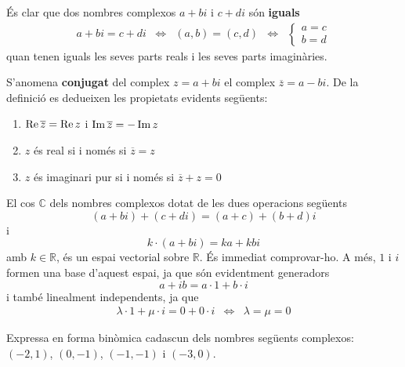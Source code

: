 És clar que dos nombres complexos $a+bi$ i $c+di$ són \textbf{iguals}
\begin{equation*}
\begin{array}{lllll}
a+bi=c+di & \Longleftrightarrow & (a,b)=(c,d) & \Longleftrightarrow &
\left\{
\begin{array}{l}
a=c \\
b=d
\end{array}
\right.
\end{array}
\end{equation*}
quan tenen iguals les seves parts reals i les seves parts imaginàries.

S’anomena \textbf{conjugat} del complex $z=a+bi$ el complex $\overline{z}
=a-bi$. De la definició es dedueixen les propietats evidents següents:

\begin{enumerate}
\item[1)] $\operatorname{Re}\overline{z}=\operatorname{Re}z$ i $\operatorname{Im}\overline{z}=-\operatorname{
Im}z$

\item[2)] $z$ és real si i només si $\overline{z}=z$

\item[3)] $z$ és imaginari pur si i només si $\overline{z}+z=0$
\end{enumerate}

El cos $\mathbb{C}$ dels nombres complexos dotat de les dues
operacions següents
\begin{equation*}
(a+bi)+(c+di)=(a+c)+(b+d)i
\end{equation*}
i
\begin{equation*}
k\cdot (a+bi)=ka+kbi
\end{equation*}
amb $k\in \mathbb{R}$, és un espai vectorial sobre $\mathbb{R}$. És immediat comprovar-ho. A més, $1$ i $i$ formen una base d’aquest espai, ja que són evidentment generadors
\begin{equation*}
a+ib=a\cdot 1+b\cdot i
\end{equation*}
i també linealment independents, ja que
\begin{equation*}
\begin{array}{ccc}
\lambda \cdot 1+\mu \cdot i=0+0\cdot i & \Longleftrightarrow & \lambda =\mu
=0
\end{array}
\end{equation*}

\begin{exemple}
Expressa en forma binòmica cadascun dels nombres següents
complexos: $(-2,1)$, $(0,-1)$, $(-1,-1)$ i $(-3,0)$.
\end{exemple}

